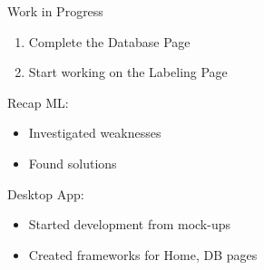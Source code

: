 \begin{frame}{Work in Progress}
    \begin{enumerate}
       \item Complete the Database Page
       \item Start working on the Labeling Page
   \end{enumerate}
\end{frame}

\begin{frame}{Recap}
    ML:
    \begin{itemize}
        \item Investigated weaknesses
        \item Found solutions
    \end{itemize}
    Desktop App:
    \begin{itemize}
        \item Started development from mock-ups
        \item Created frameworks for Home, DB pages
    \end{itemize}
\end{frame}